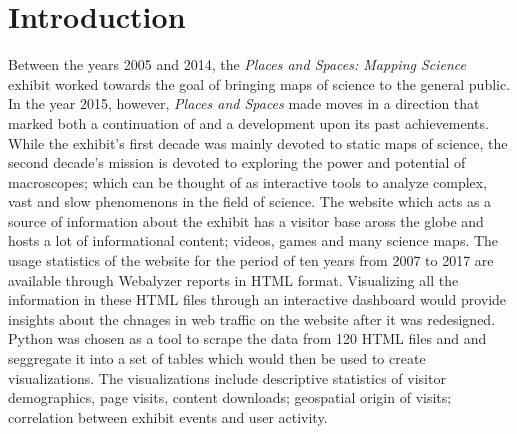 \section{Introduction} \label{intro}

Between the years 2005 and 2014, the \textit{Places and Spaces: Mapping Science} exhibit worked towards the goal of bringing maps of science to the general public. In the year 2015, however, \textit{Places and Spaces} made moves in a direction that marked both a continuation of and a development upon its past achievements. While the exhibit's first decade was mainly devoted to static maps of science, the second decade's mission is devoted to exploring the power and potential of macroscopes; which can be thought of as interactive tools to analyze complex, vast and slow phenomenons in the field of science. The website which acts as a source of information about the exhibit has a visitor base aross the globe and hosts a lot of informational content; videos, games and many science maps. The usage statistics of the website for the period of ten years from 2007 to 2017 are available through Webalyzer reports in HTML format. Visualizing all the information in these HTML files through an interactive dashboard would provide insights about the chnages in web traffic on the website after it was redesigned. Python was chosen as a tool to scrape the data from 120 HTML files and and seggregate it into a set of tables which would then be used to create visualizations. The visualizations include descriptive statistics of visitor demographics, page visits, content downloads; geospatial origin of visits; correlation between exhibit events and user activity.
